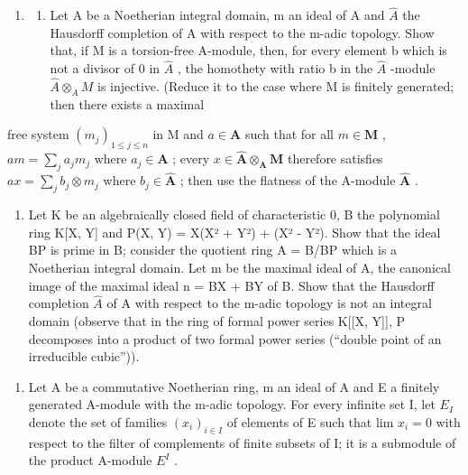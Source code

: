 \begin{enumerate}
\def\labelenumi{\arabic{enumi}.}
\setcounter{enumi}{14}
\tightlist
\item
  \begin{enumerate}
  \def\labelenumii{(\alph{enumii})}
  \tightlist
  \item
    Let A be a Noetherian integral domain, m an ideal of A and \(\hat{A}\) the Hausdorff completion of A with respect to the m-adic topology. Show that, if M is a torsion-free A-module, then, for every element b which is not a divisor of 0 in \(\hat{A}\) , the homothety with ratio b in the \(\hat{A}\) -module \(\hat{A} \otimes_{A} M\) is injective. (Reduce it to the case where M is finitely generated; then there exists a maximal
  \end{enumerate}
\end{enumerate}

 free system \((m_j)_{1\leqslant j\leqslant n}\) in M and \(a\in \mathbf{A}\) such that for all \(m\in \mathbf{M}\) , \(am = \sum_{j}a_{j}m_{j}\) where \(a_{j}\in \mathbf{A}\) ; every \(x\in \hat{\mathbf{A}}\otimes_{\mathbf{A}}\mathbf{M}\) therefore satisfies \(ax = \sum_{j}b_{j}\otimes m_{j}\) where \(b_{j}\in \hat{\mathbf{A}}\) ; then use the flatness of the A-module \(\hat{\mathbf{A}}\) .

\begin{enumerate}
\def\labelenumi{(\alph{enumi})}
\setcounter{enumi}{1}
\tightlist
\item
  Let K be an algebraically closed field of characteristic 0, B the polynomial ring K{[}X, Y{]} and P(X, Y) = X(X² + Y²) + (X² - Y²). Show that the ideal BP is prime in B; consider the quotient ring A = B/BP which is a Noetherian integral domain. Let m be the maximal ideal of A, the canonical image of the maximal ideal n = BX + BY of B. Show that the Hausdorff completion \(\hat{A}\) of A with respect to the m-adic topology is not an integral domain (observe that in the ring of formal power series K{[}{[}X, Y{]}{]}, P decomposes into a product of two formal power series (``double point of an irreducible cubic'')). 
\end{enumerate}

\begin{enumerate}
\def\labelenumi{\arabic{enumi}.}
\setcounter{enumi}{15}
\tightlist
\item
  Let A be a commutative Noetherian ring, m an ideal of A and E a finitely generated A-module with the m-adic topology. For every infinite set I, let \(E_{I}\) denote the set of families \((x_{i})_{i\in I}\) of elements of E such that lim \(x_{i}=0\) with respect to the filter of complements of finite subsets of I; it is a submodule of the product A-module \(E^{I}\) .
\end{enumerate}

